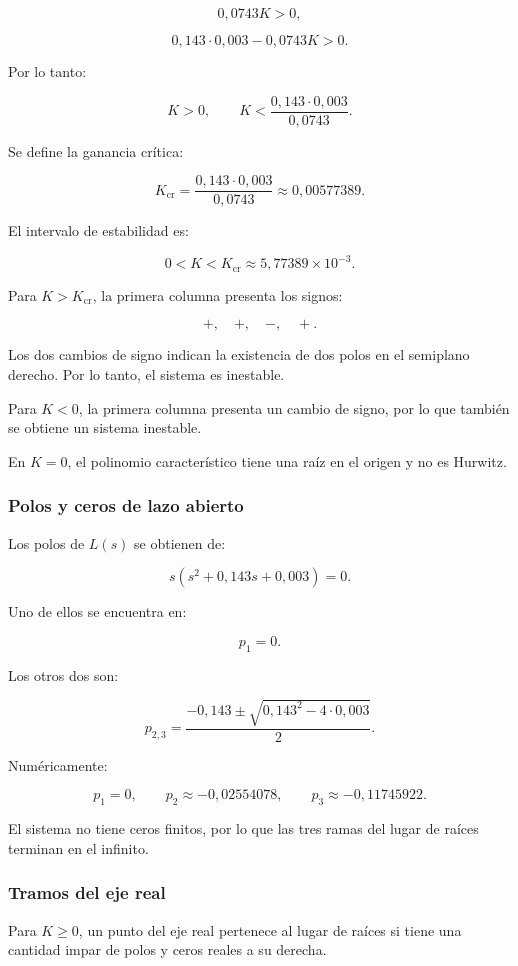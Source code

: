 \documentclass[12pt,a4paper]{article}
\begin{document}
\[
0{,}0743K>0,
\]

\[
0{,}143\cdot0{,}003-0{,}0743K>0.
\]

Por lo tanto:

\[
K>0,
\qquad
K<
\frac{
0{,}143\cdot0{,}003
}{
0{,}0743
}.
\]

Se define la ganancia crítica:

\[
K_{\mathrm{cr}}
=
\frac{
0{,}143\cdot0{,}003
}{
0{,}0743
}
\approx0{,}00577389.
\]

El intervalo de estabilidad es:

\[
\boxed{
0<K<K_{\mathrm{cr}}
\approx5{,}77389\times10^{-3}.
}
\]

Para $K>K_{\mathrm{cr}}$, la primera columna presenta
los signos:

\[
+,\quad+,\quad-,\quad+.
\]

Los dos cambios de signo indican la existencia de
dos polos en el semiplano derecho. Por lo tanto,
el sistema es inestable.

Para $K<0$, la primera columna presenta un cambio
de signo, por lo que también se obtiene un sistema
inestable.

En $K=0$, el polinomio característico tiene una raíz
en el origen y no es Hurwitz.


\subsubsection*{Polos y ceros de lazo abierto}

Los polos de $L(s)$ se obtienen de:

\[
s(s^2+0{,}143s+0{,}003)=0.
\]

Uno de ellos se encuentra en:

\[
p_1=0.
\]

Los otros dos son:

\[
p_{2,3}
=
\frac{
-0{,}143
\pm
\sqrt{
0{,}143^2-4\cdot0{,}003
}
}{2}.
\]

Numéricamente:

\[
\boxed{
p_1=0,
\qquad
p_2\approx-0{,}02554078,
\qquad
p_3\approx-0{,}11745922.
}
\]

El sistema no tiene ceros finitos, por lo que
las tres ramas del lugar de raíces terminan
en el infinito.


\subsubsection*{Tramos del eje real}

Para $K\geq0$, un punto del eje real pertenece al lugar
de raíces si tiene una cantidad impar de polos y ceros
reales a su derecha.
\end{document}
